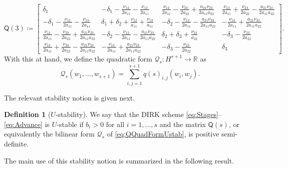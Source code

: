 \documentclass{amsart}
\newcommand{\Real}{\mathbb{R}}
\newcommand{\msfQ}{\mathsf{Q}}
\newcommand{\mclQ}{\mathcal{Q}}
\theoremstyle{definition}
\newtheorem{definition}{Definition}[section]
\begin{document}
\[
  \msfQ(3) \coloneqq 
  \begin{bmatrix}
    \delta_1 & -\delta_1 - \frac{\nu_{12}}{2a_{11}} - \frac{\nu_{13}}{2a_{11}} & \frac{\nu_{12}}{2a_{11}} - \frac{\nu_{23}}{2a_{22}} + \frac{a_{21}\nu_{23}}{2a_{11}a_{22}} & \frac{\nu_{13}}{2a_{11}} + \frac{\nu_{23}}{2a_{22}} - \frac{a_{21}\nu_{23}}{2a_{11}a_{22}}  \\
    -\delta_1 - \frac{\nu_{12}}{2a_{11}} - \frac{\nu_{13}}{2a_{11}}  & \delta_1 + \delta_2 + \frac{ \nu_{12}}{a_{11}} + \frac{ \nu_{13}}{a_{11}} & -\delta_2 - \frac{\nu_{12}}{2a_{11}} - \frac{a_{21}\nu_{23}}{2a_{11}a_{22}} & - \frac{\nu_{13}}{2a_{11}} + \frac{a_{21}\nu_{23}}{2a_{11}a_{22}} \\
    \frac{\nu_{12}}{2a_{11}} - \frac{\nu_{23}}{2a_{22}} + \frac{a_{21}\nu_{23}}{2a_{11}a_{22}} & -\delta_2 - \frac{\nu_{12}}{2a_{11}} - \frac{a_{21}\nu_{23}}{2a_{11}a_{22}} & \delta_2 + \delta_3  + \frac{\nu_{23}}{a_{22}} &  -\delta_3 - \frac{\nu_{23}}{2a_{22}} \\
    \frac{\nu_{13}}{2a_{11}} + \frac{\nu_{23}}{2a_{22}} - \frac{a_{21}\nu_{23}}{2a_{11}a_{22}} & - \frac{\nu_{13}}{2a_{11}} + \frac{a_{21}\nu_{23}}{2a_{11}a_{22}}  & -\delta_3 - \frac{\nu_{23}}{2a_{22}} & \delta_3
  \end{bmatrix} .
\]
With this at hand, we define the quadratic form $\mclQ_s : H^{s+1} \to \Real$ as
\begin{equation}
\label{eq:QQuadFormUstab}
  \mclQ_s(w_1, \ldots, w_{s+1}) = \sum_{i,j=1}^{s+1} q(s)_{i,j} (w_i,w_j).
\end{equation}

The relevant stability notion is given next.

\begin{definition}[$U$-stability]
\label{def:Ustability}
  We say that the DIRK scheme \eqref{eq:Stages}--\eqref{eq:Advance} is $U$-stable if $b_i>0$ for all $i=1,\ldots, s$ and the matrix $\msfQ(s)$, or equivalently the bilinear form $\mclQ_s$ of \eqref{eq:QQuadFormUstab}, is positive semi-definite.
\end{definition}

The main use of this stability notion is summarized in the following result.
\end{document}
